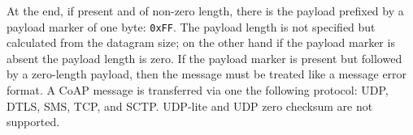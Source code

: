 	At the end, if present and of non-zero length, there is the payload prefixed by a payload marker of one byte: \texttt{0xFF}.\newline
	The payload length is not specified but calculated from the datagram size; on the other hand if the payload marker is absent the payload length is zero.\newline
	If the payload marker is present but followed by a zero-length payload, then the message must be treated like a message error format.\newline
	A CoAP message is transferred via one the following protocol: UDP, DTLS, SMS, TCP, and SCTP.\newline
	UDP-lite and UDP zero checksum are not supported.\newline
	\newpage

	\newpage
				
		
	
